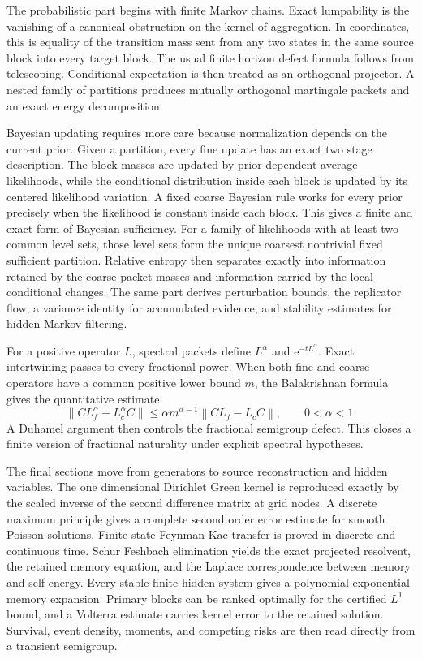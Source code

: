\documentclass[11pt,a4paper]{article}
\theoremstyle{definition}
\theoremstyle{remark}
\newcommand{\norm}[1]{\left\lVert#1\right\rVert}
\newcommand{\e}{\mathrm e}
\begin{document}
The probabilistic part begins with finite Markov chains. Exact lumpability is the vanishing of a canonical obstruction on the kernel of aggregation. In coordinates, this is equality of the transition mass sent from any two states in the same source block into every target block. The usual finite horizon defect formula follows from telescoping. Conditional expectation is then treated as an orthogonal projector. A nested family of partitions produces mutually orthogonal martingale packets and an exact energy decomposition.

Bayesian updating requires more care because normalization depends on the current prior. Given a partition, every fine update has an exact two stage description. The block masses are updated by prior dependent average likelihoods, while the conditional distribution inside each block is updated by its centered likelihood variation. A fixed coarse Bayesian rule works for every prior precisely when the likelihood is constant inside each block. This gives a finite and exact form of Bayesian sufficiency. For a family of likelihoods with at least two common level sets, those level sets form the unique coarsest nontrivial fixed sufficient partition. Relative entropy then separates exactly into information retained by the coarse packet masses and information carried by the local conditional changes. The same part derives perturbation bounds, the replicator flow, a variance identity for accumulated evidence, and stability estimates for hidden Markov filtering.

For a positive operator \(L\), spectral packets define \(L^\alpha\) and \(\e^{-tL^\alpha}\). Exact intertwining passes to every fractional power. When both fine and coarse operators have a common positive lower bound \(m\), the Balakrishnan formula gives the quantitative estimate
\[
\norm{CL_f^\alpha-L_c^\alpha C}
\leq
\alpha m^{\alpha-1}
\norm{CL_f-L_cC},
\qquad 0<\alpha<1.
\]
A Duhamel argument then controls the fractional semigroup defect. This closes a finite version of fractional naturality under explicit spectral hypotheses.

The final sections move from generators to source reconstruction and hidden variables. The one dimensional Dirichlet Green kernel is reproduced exactly by the scaled inverse of the second difference matrix at grid nodes. A discrete maximum principle gives a complete second order error estimate for smooth Poisson solutions. Finite state Feynman Kac transfer is proved in discrete and continuous time. Schur Feshbach elimination yields the exact projected resolvent, the retained memory equation, and the Laplace correspondence between memory and self energy. Every stable finite hidden system gives a polynomial exponential memory expansion. Primary blocks can be ranked optimally for the certified \(L^1\) bound, and a Volterra estimate carries kernel error to the retained solution. Survival, event density, moments, and competing risks are then read directly from a transient semigroup.
\end{document}
